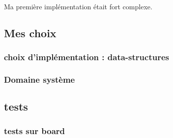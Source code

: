 	 Ma première implémentation était fort complexe.
	 
	
	\subsection{Mes choix}
		\subsubsection{choix d'implémentation : data-structures}
		\subsubsection{Domaine système}
		
	\subsection{tests}
		
	\subsubsection{tests sur board}	

